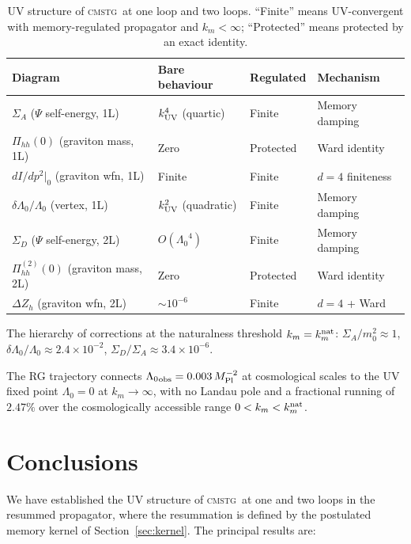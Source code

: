 \documentclass[12pt,a4paper]{article}
\newcommand{\CMSTG}{\textsc{cmstg}}
\newcommand{\Lz}{{\Lambda_0}}
\newcommand{\Mpl}{M_{\rm Pl}}
\newcommand{\km}{{k_m}}
\newcommand{\knat}{{k_m^{\rm nat}}}
\begin{document}
\begin{table}[h!]
  \centering
  \caption{UV structure of \CMSTG\ at one loop and two loops.
  ``Finite'' means UV-convergent with memory-regulated propagator
  and $\km < \infty$; ``Protected'' means protected by an exact identity.}
  \label{tab:uv-summary}
  \begin{tabular}{llll}
    \toprule
    Diagram & Bare behaviour & Regulated & Mechanism \\
    \midrule
    $\Sigma_A$ ($\Psi$ self-energy, 1L)
      & $k_{\rm UV}^4$ (quartic) & Finite & Memory damping \\
    $\Pi_{hh}(0)$ (graviton mass, 1L)
      & Zero & Protected & Ward identity \\
    $dI/dp^2|_0$ (graviton wfn, 1L)
      & Finite & Finite & $d=4$ finiteness \\
    $\delta\Lz/\Lz$ (vertex, 1L)
      & $k_{\rm UV}^2$ (quadratic) & Finite & Memory damping \\
    $\Sigma_D$ ($\Psi$ self-energy, 2L)
      & $O(\Lz^4)$ & Finite & Memory damping \\
    $\Pi_{hh}^{(2)}(0)$ (graviton mass, 2L)
      & Zero & Protected & Ward identity \\
    $\Delta Z_h$ (graviton wfn, 2L)
      & $\sim10^{-6}$ & Finite & $d=4$ + Ward \\
    \bottomrule
  \end{tabular}
\end{table}

The hierarchy of corrections at the naturalness threshold $\km = \knat$:
$\Sigma_A/m_0^2 \approx 1$, $\delta\Lz/\Lz \approx 2.4\times10^{-2}$,
$\Sigma_D/\Sigma_A \approx 3.4\times10^{-6}$.

The RG trajectory connects $\Lz_{\rm obs} = 0.003\,\Mpl^{-2}$ at cosmological
scales to the UV fixed point $\Lz = 0$ at $\km \to \infty$, with no Landau
pole and a fractional running of $2.47\%$ over the cosmologically accessible
range $0 < \km < \knat$.

\section{Conclusions}
\label{sec:conclusions}

We have established the UV structure of \CMSTG\ at one and two loops in the
resummed propagator, where the resummation is defined by the postulated memory
kernel of Section~\ref{sec:kernel}. The principal results are:
\end{document}
